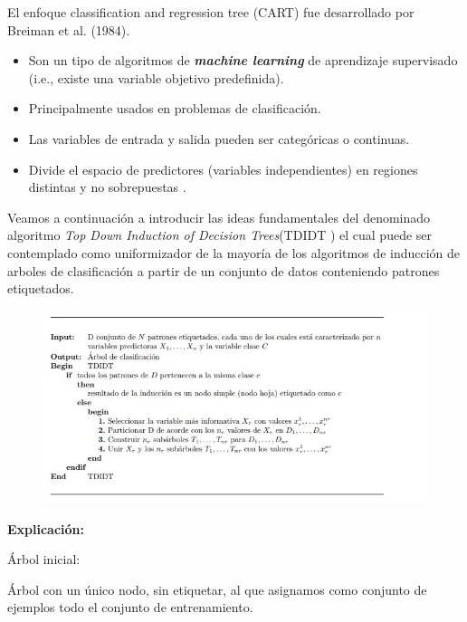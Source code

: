 \documentclass[10pt]{article}
\begin{document}
El enfoque classification and regression tree (CART) fue desarrollado por Breiman et al. (1984)\cite{IEEEreferencias:Ref44}.

\begin{itemize}
    \item Son un tipo de algoritmos de \textit{\textbf{machine learning}} de aprendizaje supervisado (i.e., existe una variable objetivo predefinida).
    \item Principalmente usados en problemas de clasificación.
    \item Las variables de entrada y salida pueden ser categóricas o continuas.
    \item Divide el espacio de predictores (variables independientes) en regiones distintas y no sobrepuestas \cite{IEEEreferencias:Ref44}.
\end{itemize}


Veamos a continuación a introducir las ideas fundamentales del denominado algoritmo \textit{Top Down Induction of Decision Trees}(TDIDT ) el cual puede ser contemplado como uniformizador de la mayoría de los algoritmos de inducción de arboles de clasificación a partir de un conjunto de datos conteniendo patrones etiquetados\cite{IEEEreferencias:Ref15}.

\begin{figure}[H]
	\begin{center}
\includegraphics[scale = 0.85]{Imagenes/algoritmo.JPG}
	\end{center} 
\end{figure}

\setlength{\parskip}{2mm}
\newpage

\textbf{Explicación:}

Árbol inicial:

Árbol con un único nodo, sin etiquetar, al que asignamos como conjunto de ejemplos todo el conjunto de entrenamiento.
\end{document}
